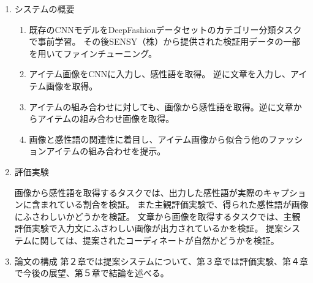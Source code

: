 \begin{enumerate}
  \item システムの概要
  \begin{enumerate}
      \item 既存のCNNモデルをDeepFashionデータセットのカテゴリー分類タスクで事前学習。
      その後SENSY（株）から提供された検証用データの一部を用いてファインチューニング。

      \item アイテム画像をCNNに入力し、感性語を取得。
      逆に文章を入力し、アイテム画像を取得。

      \item アイテムの組み合わせに対しても、画像から感性語を取得。逆に文章からアイテムの組み合わせ画像を取得。

      \item 画像と感性語の関連性に着目し、アイテム画像から似合う他のファッションアイテムの組み合わせを提示。
  \end{enumerate}

  \item 評価実験

  画像から感性語を取得するタスクでは、出力した感性語が実際のキャプションに含まれている割合を検証。
  また主観評価実験で、得られた感性語が画像にふさわしいかどうかを検証。
  文章から画像を取得するタスクでは、主観評価実験で入力文にふさわしい画像が出力されているかを検証。
  提案システムに関しては、提案されたコーディネートが自然かどうかを検証。

  \item 論文の構成
  第２章では提案システムについて、第３章では評価実験、第４章で今後の展望、第５章で結論を述べる。




\end{enumerate}
